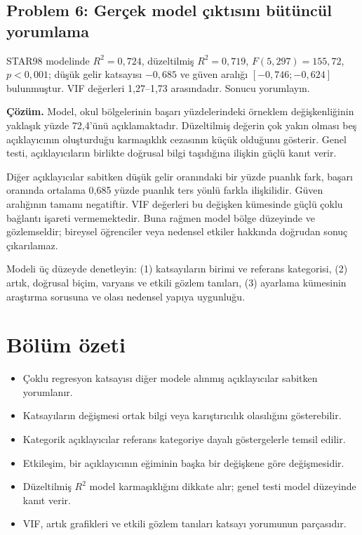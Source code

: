 \subsection*{Problem 6: Gerçek model çıktısını bütüncül yorumlama}

STAR98 modelinde $R^2=0{,}724$, düzeltilmiş $R^2=0{,}719$,
$F(5,297)=155{,}72$, $p<0{,}001$; düşük gelir katsayısı
$-0{,}685$ ve güven aralığı $[-0{,}746;-0{,}624]$ bulunmuştur. VIF değerleri
1,27--1,73 arasındadır. Sonucu yorumlayın.

\textbf{Çözüm.} Model, okul bölgelerinin başarı yüzdelerindeki örneklem
değişkenliğinin yaklaşık yüzde 72,4'ünü açıklamaktadır. Düzeltilmiş değerin
çok yakın olması beş açıklayıcının oluşturduğu karmaşıklık cezasının küçük
olduğunu gösterir. Genel \Fstat testi, açıklayıcıların birlikte doğrusal bilgi
taşıdığına ilişkin güçlü kanıt verir.

Diğer açıklayıcılar sabitken düşük gelir oranındaki bir yüzde puanlık fark,
başarı oranında ortalama 0,685 yüzde puanlık ters yönlü farkla ilişkilidir.
Güven aralığının tamamı negatiftir. VIF değerleri bu değişken kümesinde güçlü
çoklu bağlantı işareti vermemektedir. Buna rağmen model bölge düzeyinde ve
gözlemseldir; bireysel öğrenciler veya nedensel etkiler hakkında doğrudan
sonuç çıkarılamaz.





\begin{etkinlik}
Modeli üç düzeyde denetleyin: (1) katsayıların birimi ve referans kategorisi,
(2) artık, doğrusal biçim, varyans ve etkili gözlem tanıları, (3) ayarlama
kümesinin araştırma sorusuna ve olası nedensel yapıya uygunluğu.
\end{etkinlik}

\section{Bölüm özeti}

\begin{itemize}
  \item Çoklu regresyon katsayısı diğer modele alınmış açıklayıcılar sabitken yorumlanır.
  \item Katsayıların değişmesi ortak bilgi veya karıştırıcılık olasılığını gösterebilir.
  \item Kategorik açıklayıcılar referans kategoriye dayalı göstergelerle temsil edilir.
  \item Etkileşim, bir açıklayıcının eğiminin başka bir değişkene göre değişmesidir.
  \item Düzeltilmiş $R^2$ model karmaşıklığını dikkate alır; genel \Fstat testi model düzeyinde kanıt verir.
  \item VIF, artık grafikleri ve etkili gözlem tanıları katsayı yorumunun parçasıdır.
\end{itemize}

